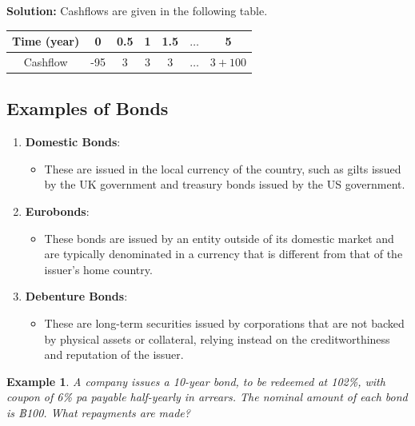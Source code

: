 \documentclass[
]{book}
\providecommand{\tightlist}{%
  \setlength{\itemsep}{0pt}\setlength{\parskip}{0pt}}
\theoremstyle{definition}
\theoremstyle{definition}
\newtheorem{example}{Example}[chapter]
\theoremstyle{definition}
\theoremstyle{definition}
\theoremstyle{remark}
\begin{document}
\textbf{Solution:} Cashflows are given in the following table.

\begin{longtable}[]{@{}ccccccc@{}}
\toprule\noalign{}
Time (year) & 0 & 0.5 & 1 & 1.5 & \(\ldots\) & 5 \\
\midrule\noalign{}
\endhead
\bottomrule\noalign{}
\endlastfoot
Cashflow & -95 & 3 & 3 & 3 & \(\ldots\) & \(3 + 100\) \\
\end{longtable}

\subsection{Examples of Bonds}\label{examples-of-bonds}

\begin{enumerate}
\def\labelenumi{\arabic{enumi}.}
\tightlist
\item
  \textbf{Domestic Bonds}:

  \begin{itemize}
  \tightlist
  \item
    These are issued in the local currency of the country, such as gilts issued by the UK government and treasury bonds issued by the US government.
  \end{itemize}
\item
  \textbf{Eurobonds}:

  \begin{itemize}
  \tightlist
  \item
    These bonds are issued by an entity outside of its domestic market and are typically denominated in a currency that is different from that of the issuer's home country.
  \end{itemize}
\item
  \textbf{Debenture Bonds}:

  \begin{itemize}
  \tightlist
  \item
    These are long-term securities issued by corporations that are not backed by physical assets or collateral, relying instead on the creditworthiness and reputation of the issuer.
  \end{itemize}
\end{enumerate}

\begin{example}
\protect\hypertarget{exm:exampleBondPrice}{}\label{exm:exampleBondPrice}\emph{A company issues a 10-year bond, to be redeemed at 102\%, with coupon of
6\% pa payable half-yearly in arrears. The nominal amount of each bond is
฿100. What repayments are made?}
\end{example}
\end{document}
